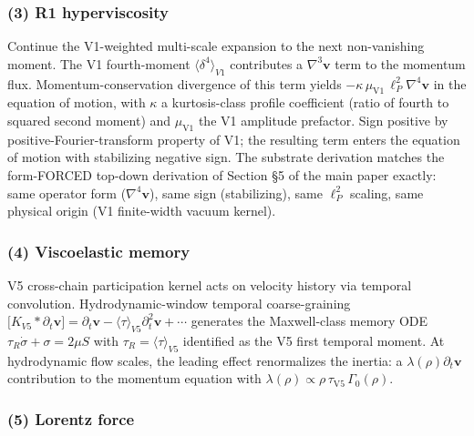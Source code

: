 \documentclass[
]{article}
\begin{document}
\subsubsection{(3) R1 hyperviscosity}\label{r1-hyperviscosity}

Continue the V1-weighted multi-scale expansion to the next non-vanishing
moment. The V1 fourth-moment \(\bigl\langle\delta^4\bigr\rangle_{V1}\)
contributes a \(\nabla^3\mathbf{v}\) term to the momentum flux.
Momentum-conservation divergence of this term yields
\(-\kappa\,\mu_\mathrm{V1}\,\ell_P^2\nabla^4\mathbf{v}\) in the equation
of motion, with \(\kappa\) a kurtosis-class profile coefficient (ratio
of fourth to squared second moment) and \(\mu_\mathrm{V1}\) the V1
amplitude prefactor. Sign positive by positive-Fourier-transform
property of V1; the resulting term enters the equation of motion with
stabilizing negative sign. The substrate derivation matches the
form-FORCED top-down derivation of Section §5 of the main paper exactly:
same operator form (\(\nabla^4\mathbf{v}\)), same sign (stabilizing),
same \(\ell_P^2\) scaling, same physical origin (V1 finite-width vacuum
kernel).

\subsubsection{(4) Viscoelastic memory}\label{viscoelastic-memory}

V5 cross-chain participation kernel acts on velocity history via
temporal convolution. Hydrodynamic-window temporal coarse-graining
\(\bigl[K_{V5}\ast\partial_t\mathbf{v}\bigr] = \partial_t\mathbf{v} - \bigl\langle\tau\bigr\rangle_{V5}\partial_t^2\mathbf{v} + \cdots\)
generates the Maxwell-class memory ODE
\(\tau_R\dot\sigma + \sigma = 2\mu S\) with
\(\tau_R = \bigl\langle\tau\bigr\rangle_{V5}\) identified as the V5
first temporal moment. At hydrodynamic flow scales, the leading effect
renormalizes the inertia: a \(\lambda(\rho)\partial_t\mathbf{v}\)
contribution to the momentum equation with
\(\lambda(\rho) \propto \rho\,\tau_\mathrm{V5}\,\Gamma_0(\rho)\).

\subsubsection{(5) Lorentz force}\label{lorentz-force}
\end{document}

